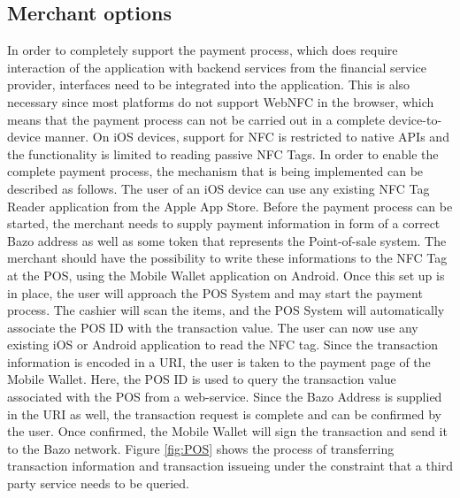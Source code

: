 \subsection{Merchant options}\label{merchantoptions}
In order to completely support the payment process, which does require interaction of the application with backend services from the financial service provider, interfaces need to be integrated into the application.
This is also necessary since most platforms do not support WebNFC in the browser, which means that the payment process can not be carried out in a complete device-to-device manner. On iOS devices, support for NFC is restricted to native APIs and the functionality is limited to reading passive NFC Tags.
In order to enable the complete payment process, the mechanism that is being implemented can be described as follows. The user of an iOS device can use any existing NFC Tag Reader application from the Apple App Store. Before the payment process can be started, the merchant needs to supply payment information in form of a correct Bazo address as well as some token that represents the Point-of-sale system. The merchant should have the possibility to write these informations to the NFC Tag at the POS, using the Mobile Wallet application on Android.
Once this set up is in place, the user will approach the POS System and may start the payment process. The cashier will scan the items, and the POS System will automatically associate the POS ID with the transaction value. The user can now use any existing iOS or Android application to read the NFC tag. Since the transaction information is encoded in a URI, the user is taken to the payment page of the Mobile Wallet. Here, the POS ID is used to query the transaction value associated with the POS from a web-service. Since the Bazo Address is supplied in the URI as well, the transaction request is complete and can be confirmed by the user. Once confirmed, the Mobile Wallet will sign the transaction and send it to the Bazo network. Figure
\ref{fig:POS} shows the process of transferring transaction information and transaction issueing under the constraint that a third party service needs to be queried.

